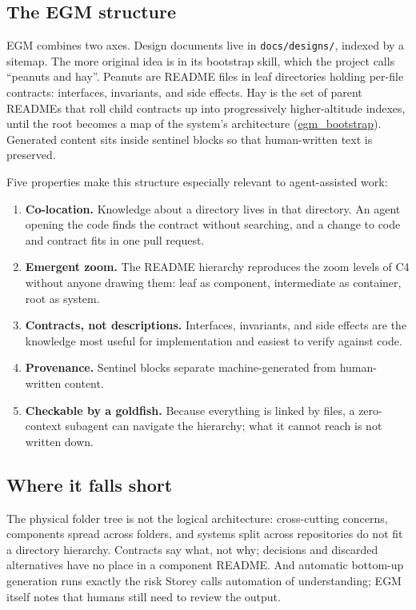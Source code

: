 \documentclass[11pt]{article}
\begin{document}
\subsection{The EGM structure}

EGM combines two axes. Design documents live in \texttt{docs/designs/}, indexed by a sitemap. The more original idea is in its bootstrap skill, which the project calls ``peanuts and hay''. Peanuts are README files in leaf directories holding per-file contracts: interfaces, invariants, and side effects. Hay is the set of parent READMEs that roll child contracts up into progressively higher-altitude indexes, until the root becomes a map of the system's architecture (\href{https://github.com/google/elephant-goldfish-model/blob/main/skills/egm_bootstrap/SKILL.md}{egm\_bootstrap}). Generated content sits inside sentinel blocks so that human-written text is preserved.

Five properties make this structure especially relevant to agent-assisted work:

\begin{enumerate}[leftmargin=*]
  \item \textbf{Co-location.} Knowledge about a directory lives in that directory. An agent opening the code finds the contract without searching, and a change to code and contract fits in one pull request.
  \item \textbf{Emergent zoom.} The README hierarchy reproduces the zoom levels of C4 without anyone drawing them: leaf as component, intermediate as container, root as system.
  \item \textbf{Contracts, not descriptions.} Interfaces, invariants, and side effects are the knowledge most useful for implementation and easiest to verify against code.
  \item \textbf{Provenance.} Sentinel blocks separate machine-generated from human-written content.
  \item \textbf{Checkable by a goldfish.} Because everything is linked by files, a zero-context subagent can navigate the hierarchy; what it cannot reach is not written down.
\end{enumerate}

\subsection{Where it falls short}

The physical folder tree is not the logical architecture: cross-cutting concerns, components spread across folders, and systems split across repositories do not fit a directory hierarchy. Contracts say what, not why; decisions and discarded alternatives have no place in a component README. And automatic bottom-up generation runs exactly the risk Storey calls automation of understanding; EGM itself notes that humans still need to review the output.
\end{document}
